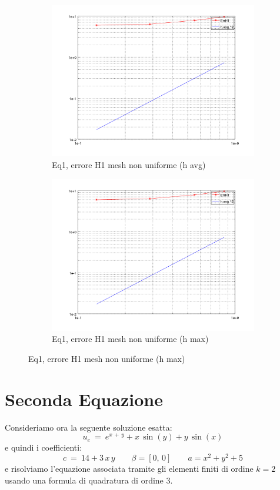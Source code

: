 \documentclass[12pt,a4paper]{report}
\theoremstyle{theorem}
\theoremstyle{theorem}
\theoremstyle{definition}
\begin{document}
\begin{figure}[!h]
	\centering
	\begin{subfigure}[b]{0.49\textwidth}
    		\includegraphics[width=\textwidth]{Eq1-H1avg.png}
    		\caption{Eq1, errore H1 mesh non uniforme (h avg)}
    	\end{subfigure}
    	\begin{subfigure}[b]{0.49\textwidth}
    		\includegraphics[width=\textwidth]{Eq1-H1max.png}
    		\caption{Eq1, errore H1 mesh non uniforme (h max)}
    	\end{subfigure}
\end{figure}




\section{Seconda Equazione}
Consideriamo ora la seguente soluzione esatta:
\[ u_e \ = \ e^{x \, + \, y} + x \, \sin(y) + y \, \sin(x) \]
e quindi i coefficienti:
\[ c \ = \ 14 + 3 \, x \, y \qquad \beta = [0, \, 0] \qquad a = x^2 + y^2 + 5 \]
e risolviamo l'equazione associata tramite gli elementi finiti di ordine $k = 2$ usando una formula di quadratura di ordine $3$. 
\end{document}
